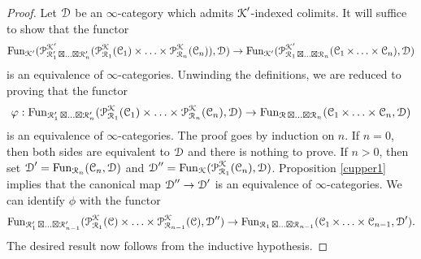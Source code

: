 \begin{proof}
Let $\calD$ be an $\infty$-category which admits $\calK'$-indexed colimits. It will suffice to show that
the functor
$$ \Fun_{\calK'} (  \calP^{\calK'}_{ \calR'_1 \boxtimes \ldots \boxtimes \calR'_{n} }( \calP^{\calK}_{\calR_1}( \calC_1) \times \ldots \times \calP^{\calK}_{ \calR_n}(\calC_n) ), \calD) 
\rightarrow \Fun_{\calK'}(  \calP^{\calK'}_{ \calR_1 \boxtimes \ldots \boxtimes \calR_n}( \calC_1 \times \ldots \times \calC_n), \calD)$$ is an equivalence of $\infty$-categories. Unwinding the definitions, we are reduced to proving that the functor
$$ \phi: \Fun_{ \calR'_1 \boxtimes \ldots \boxtimes \calR'_n}(
\calP^{\calK}_{ \calR_1}( \calC_1) \times \ldots \times \calP^{\calK}_{ \calR_n}(\calC_n), \calD)
\rightarrow \Fun_{ \calR \boxtimes \ldots \boxtimes \calR_n}( \calC_1 \times \ldots \times \calC_n, \calD)$$ is an equivalence of $\infty$-categories.
The proof goes by induction
on $n$. If $n = 0$, then both sides are equivalent to $\calD$ and there is nothing to prove.
If $n > 0$, then set $\calD' = \Fun_{\calR_{n}}( \calC_n, \calD)$ and $\calD'' = \Fun_{ \calK}(
\calP^{\calK}_{\calR_1}(\calC_n), \calD)$. Proposition \ref{cupper1} implies that the canonical map
$\calD'' \rightarrow \calD'$ is an equivalence of $\infty$-categories. We can identify $\phi$ with
the functor
$$ 
 \Fun_{\calR'_1 \boxtimes \ldots \boxtimes \calR'_{n-1}} ( \calP^{\calK}_{\calR_1}( \calC)
 \times \ldots \times \calP^{\calK}_{\calR_{n-1}}(\calC), \calD'') \rightarrow
 \Fun_{ \calR_1 \boxtimes \ldots \boxtimes \calR_{n-1}}( \calC_1 \times \ldots \times \calC_{n-1}, \calD').$$
The desired result now follows from the inductive hypothesis.
\end{proof}

